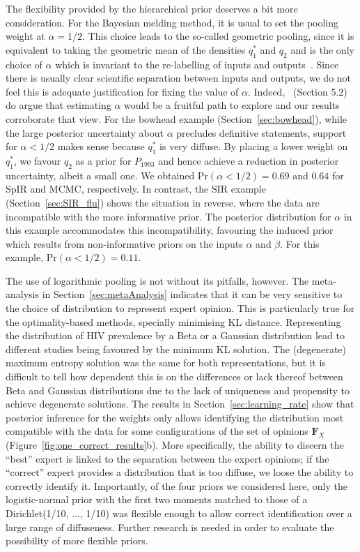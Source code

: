 \documentclass[a4paper, notitlepage, 10pt]{article}
\begin{document}
The flexibility provided by the hierarchical prior deserves a bit more consideration.
For the Bayesian melding method, it is usual to set the pooling weight at $\alpha = 1/2$.
This choice leads to the so-called geometric pooling, since it is equivalent to taking the geometric mean of the densities $q_1^\ast$ and $q_2$ and is the only choice of $\alpha$ which is invariant to the re-labelling of inputs and outputs~\citep{poole2000}.
Since there is usually clear scientific separation between inputs and outputs, we do not feel this is adequate justification for fixing the value of $\alpha$.
Indeed,~\cite{poole2000} (Section 5.2) do argue that estimating $\alpha$ would be a fruitful path to explore and our results corroborate that view.
For the bowhead example (Section~\ref{sec:bowhead}), while the large posterior uncertainty about $\alpha$ precludes definitive statements, support for $\alpha < 1/2$ makes sense because $q_1^\ast$ is very diffuse.
By placing a lower weight on $q_1^\ast$, we favour $q_2$ as a prior for $P_{1993}$ and hence achieve a reduction  in posterior uncertainty, albeit a small one.
We obtained $\text{Pr}(\alpha < 1/2) = 0.69$ and $0.64$ for SpIR and MCMC, respectively.
In contrast, the SIR example (Section~\ref{sec:SIR_flu}) shows the situation in reverse, where the data are incompatible with the more informative prior.
The posterior distribution for $\alpha$ in this example accommodates this incompatibility, favouring the induced prior which results from non-informative priors on the inputs $\alpha$ and $\beta$.
For this example, $\text{Pr}(\alpha < 1/2)= 0.11$.

The use of logarithmic pooling is not without its pitfalls, however.
The meta-analysis in Section~\ref{sec:metaAnalysis} indicates that it can be very sensitive to the choice of distribution to represent expert opinion.
This is particularly true for the optimality-based methods, specially minimising KL distance.
Representing the distribution of HIV prevalence by a Beta or a Gaussian distribution lead to different studies being favoured by the minimum KL solution.
The (degenerate) maximum entropy solution was the same for both representations, but it is difficult to tell how dependent this is on the differences or lack thereof between Beta and Gaussian distributions due to the lack of uniqueness and propensity to achieve degenerate solutions.
The results in Section~\ref{sec:learning_rate} show that posterior inference for the weights only allows identifying the distribution most compatible with the data for some configurations of the set of opinions $\boldsymbol F_X$ (Figure~\ref{fig:one_correct_results}b).
More specifically, the ability to discern the ``best'' expert is linked to the separation between the expert opinions; if the ``correct'' expert provides a distribution that is too diffuse, we loose the ability to correctly identify it.
Importantly, of the four priors we considered here, only the logistic-normal prior with the first two moments matched to those of a Dirichlet(1/10, $\ldots$, 1/10) was flexible enough to allow correct identification over a large range of diffuseness.
Further research is needed in order to evaluate the possibility of more flexible priors.
\end{document}
